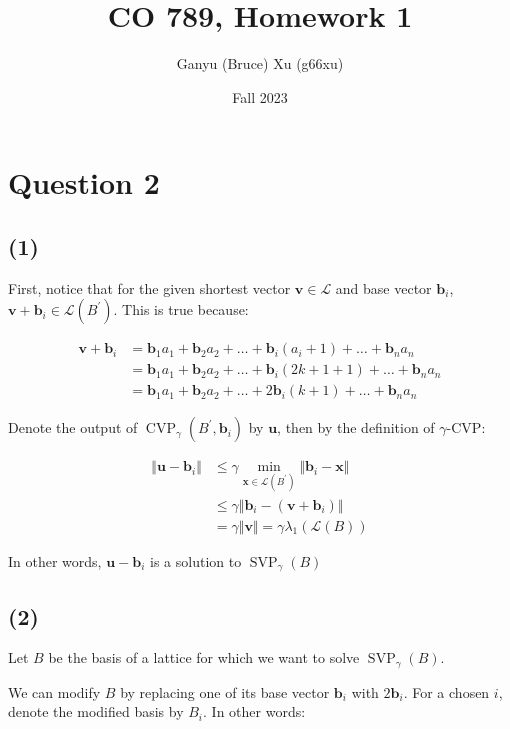 \documentclass{article}
\title{CO 789, Homework 1}
\author{Ganyu (Bruce) Xu (g66xu)}
\date{Fall 2023}
\newcommand{\norm}[1]{\Vert {#1} \Vert}
\begin{document}

\section*{Question 2}
\subsection*{(1)}
First, notice that for the given shortest vector $\mathbf{v} \in \mathcal{L}$ and base vector $\mathbf{b}_i$, $\mathbf{v} + \mathbf{b}_i \in \mathcal{L}(B^\prime)$. This is true because:

$$
\begin{aligned}
\mathbf{v} + \mathbf{b}_i
&= \mathbf{b}_1a_1 + \mathbf{b}_2a_2 + \ldots + \mathbf{b}_i(a_i + 1) + \ldots + \mathbf{b}_na_n \\
&= \mathbf{b}_1a_1 + \mathbf{b}_2a_2 + \ldots + \mathbf{b}_i(2k + 1 + 1) + \ldots + \mathbf{b}_na_n \\
&= \mathbf{b}_1a_1 + \mathbf{b}_2a_2 + \ldots + 2\mathbf{b}_i(k + 1) + \ldots + \mathbf{b}_na_n
\end{aligned}
$$

Denote the output of $\operatorname{CVP}_\gamma(B^\prime, \mathbf{b}_i)$ by $\mathbf{u}$, then by the definition of $\gamma$-CVP:

$$
\begin{aligned}
\norm{\mathbf{u} - \mathbf{b}_i} 
&\leq \gamma \min_{\mathbf{x} \in \mathcal{L}(B^\prime)}\norm{\mathbf{b}_i - \mathbf{x}} \\
& \leq \gamma \norm{\mathbf{b}_i - (\mathbf{v} + \mathbf{b}_i)} \\
&= \gamma \norm{\mathbf{v}} = \gamma \lambda_1(\mathcal{L}(B)) 
\end{aligned}
$$

In other words, $\mathbf{u} - \mathbf{b}_i$ is a solution to $\operatorname{SVP}_\gamma(B)$

\subsection*{(2)}
Let $B$ be the basis of a lattice for which we want to solve $\operatorname{SVP}_\gamma(B)$.

We can modify $B$ by replacing one of its base vector $\mathbf{b}_i$ with $2\mathbf{b}_i$. For a chosen $i$, denote the modified basis by $B_i$. In other words:
\end{document}
